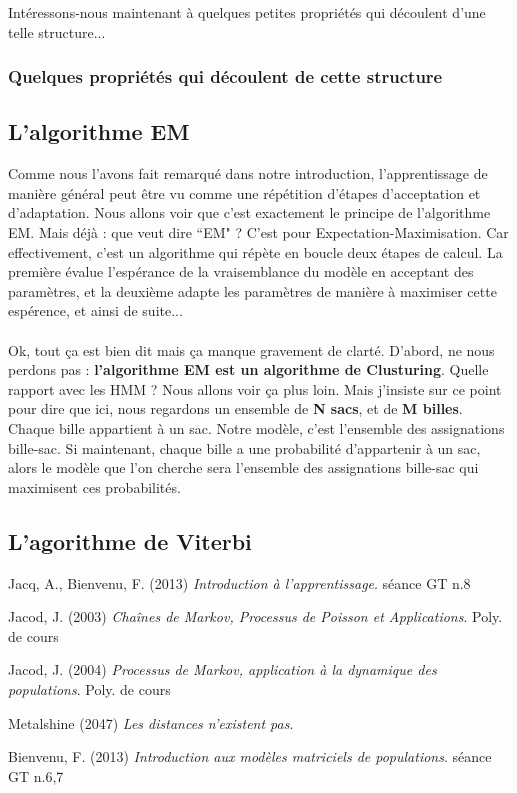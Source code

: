 \documentclass{article}
\begin{document}
Intéressons-nous maintenant à quelques petites propriétés qui découlent d'une telle structure...

\subsubsection{Quelques propriétés qui découlent de cette structure}

\subsection{L'algorithme EM}

Comme nous l'avons fait remarqué dans notre introduction, l'apprentissage de manière général peut être vu comme une répétition d'étapes d'acceptation et d'adaptation. Nous allons voir que c'est exactement le principe de l'algorithme EM. Mais déjà : que veut dire ``EM" ? C'est pour Expectation-Maximisation. Car effectivement, c'est un algorithme qui répète en boucle deux étapes de calcul. La première évalue l'espérance de la vraisemblance du modèle en acceptant des paramètres, et la deuxième adapte les paramètres de manière à maximiser cette espérence, et ainsi de suite...\\
\\
Ok, tout ça est bien dit mais ça manque gravement de clarté. D'abord, ne nous perdons pas : \textbf{l'algorithme EM est un algorithme de Clusturing}. Quelle rapport avec les HMM ? Nous allons voir ça plus loin. Mais j'insiste sur ce point pour dire que ici, nous regardons un ensemble de \textbf{N sacs}, et de \textbf{M billes}. Chaque bille appartient à un sac. Notre modèle, c'est l'ensemble des assignations bille-sac. Si maintenant, chaque bille a une probabilité d'appartenir à un sac, alors le modèle que l'on cherche sera l'ensemble des assignations bille-sac qui maximisent ces probabilités. 

\subsection{L'agorithme de Viterbi}
\newpage
\begin{thebibliography}{9}

  Jacq, A., Bienvenu, F. (2013)
  \emph{Introduction à l'apprentissage}.
  séance GT n.8
  
  Jacod, J. (2003)
  \emph{Cha\^ines de Markov, Processus de Poisson et Applications}.
  Poly. de cours
  
  Jacod, J. (2004)
  \emph{Processus de Markov, application à la dynamique des populations}.
  Poly. de cours

  Metalshine (2047)
  \emph{Les distances n'existent pas}.
  
  Bienvenu, F. (2013)
  \emph{Introduction aux modèles matriciels de populations}.
  séance GT n.6,7
  
  
\end{thebibliography}
\end{document}
